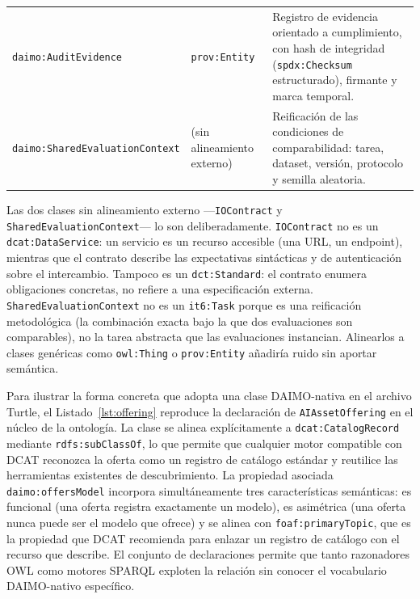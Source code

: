 \documentclass[11pt,a4paper]{article}
\newcommand{\code}[1]{\texttt{#1}}
\begin{document}
\begin{table}[t]
\begin{tabularx}{\textwidth}{@{}L{4.2cm}L{3cm}X@{}}
\code{daimo:AuditEvidence} & \code{prov:Entity} & Registro de evidencia orientado a cumplimiento, con hash de integridad (\code{spdx:Checksum} estructurado), firmante y marca temporal. \\[0.3em]
\code{daimo:SharedEvaluationContext} & (sin alineamiento externo) & Reificación de las condiciones de comparabilidad: tarea, dataset, versión, protocolo y semilla aleatoria. \\
\bottomrule
\end{tabularx}
\end{table}

Las dos clases sin alineamiento externo ---\code{IOContract} y \code{SharedEvaluationContext}--- lo son deliberadamente. \code{IOContract} no es un \code{dcat:DataService}: un servicio es un recurso accesible (una URL, un endpoint), mientras que el contrato describe las expectativas sintácticas y de autenticación sobre el intercambio. Tampoco es un \code{dct:Standard}: el contrato enumera obligaciones concretas, no refiere a una especificación externa. \code{SharedEvaluationContext} no es un \code{it6:Task} porque es una reificación metodológica (la combinación exacta bajo la que dos evaluaciones son comparables), no la tarea abstracta que las evaluaciones instancian. Alinearlos a clases genéricas como \code{owl:Thing} o \code{prov:Entity} añadiría ruido sin aportar semántica.

Para ilustrar la forma concreta que adopta una clase DAIMO-nativa en el archivo Turtle, el Listado~\ref{lst:offering} reproduce la declaración de \code{AIAssetOffering} en el núcleo de la ontología. La clase se alinea explícitamente a \code{dcat:CatalogRecord} mediante \code{rdfs:subClassOf}, lo que permite que cualquier motor compatible con DCAT reconozca la oferta como un registro de catálogo estándar y reutilice las herramientas existentes de descubrimiento. La propiedad asociada \code{daimo:offersModel} incorpora simultáneamente tres características semánticas: es funcional (una oferta registra exactamente un modelo), es asimétrica (una oferta nunca puede ser el modelo que ofrece) y se alinea con \code{foaf:primaryTopic}, que es la propiedad que DCAT recomienda para enlazar un registro de catálogo con el recurso que describe. El conjunto de declaraciones permite que tanto razonadores OWL como motores SPARQL exploten la relación sin conocer el vocabulario DAIMO-nativo específico.
\end{document}
